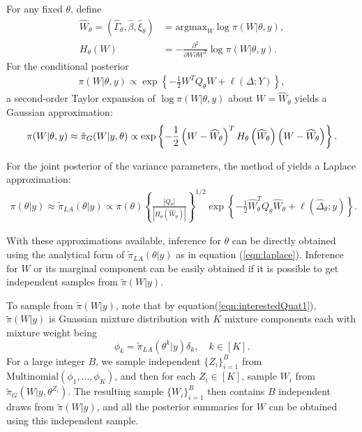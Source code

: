\documentclass[ba]{imsart}
\begin{document}
For any fixed $\theta$, define
\begin{equation}\begin{aligned}\label{eqn:modeandhessian}
\widehat{W}_{\theta} = \left(\widehat{\Gamma}_{\theta},\widehat{\beta},\widehat{\xi}_{\theta}\right) &= \text{argmax}_{W}\log\pi(W|\theta,y) , \\ 
H_{\theta}(W) &= -\frac{\partial^{2}}{\partial W \partial W^{T}}\log\pi(W|\theta,y).
\end{aligned}\end{equation}
For the conditional posterior
\begin{equation}\begin{aligned}\label{eqn:condpost}
\pi(W|\theta,y) \propto \exp\left\lbrace -\frac{1}{2}W^{T}Q_{\theta}W + \ell\left(\Delta;Y\right)\right\rbrace,
\end{aligned}\end{equation}
a second-order Taylor expansion of $\log\pi(W|\theta,y)$ about $W = \widehat{W}_{\theta}$ yields a Gaussian approximation:
\begin{equation}\label{eqn:gaussianapprox}
\pi(W|\theta,y) \approx \tilde{\pi}_{G}(W|y,\theta) \propto \text{exp}\left\{-\frac{1}{2} \left(W-\widehat{W}_{\theta} \right)^T H_\theta\left(\widehat{W}_{\theta}\right) \left(W-\widehat{W}_{\theta} \right) \right\}. \\
\end{equation}

For the joint posterior of the variance parameters, the method of \cite{tierney} yields a Laplace approximation:
\begin{equation}\begin{aligned}\label{eqn:laplace}
\pi(\theta|y) \approx \tilde{\pi}_{LA}(\theta|y) \propto \pi(\theta)\left\{\frac{\left|Q_{\theta}\right|}{\left|H_{\theta}\left(\widehat{W}_{\theta}\right)\right|}\right\}^{1/2}\exp\left\{ -\frac{1}{2}\widehat{W}_{\theta}^{T}Q_{\theta}\widehat{W}_{\theta} + \ell\left(\widehat{\Delta}_{\theta};y \right)\right\}.
\end{aligned}\end{equation}

With these approximations available, inference for $\theta$ can be directly obtained using the analytical form of $\tilde{\pi}_{LA}(\theta|y)$ as in equation (\ref{eqn:laplace}). Inference for $W$ or its marginal component can be easily obtained if it is possible to get independent samples from $\tilde{\pi}(W|y)$. 

To sample from $\tilde{\pi}(W|y)$, note that by equation(\ref{eqn:interestedQuat1}), $\tilde{\pi}(W|y)$ is Guassian mixture distribution with $K$ mixture components each with mixture weight being $$\phi_k = \tilde{\pi}_{LA}(\theta^{k}|y)\delta_{k},\quad k \in [K].$$
For a large integer $B$, we sample independent $\{Z_i\}_{i=1}^{B}$ from $\text{Multinomial}(\phi_1,...,\phi_K)$, and then for each $Z_i \in [K]$, sample $W_i$ from $\tilde{\pi}_{G}(W|y,\theta^{Z_i})$. The resulting sample $\{W_i\}_{i=1}^{B}$ then contains $B$ independent draws from $\tilde{\pi}(W|y)$, and all the posterior summaries for $W$ can be obtained using this independent sample.
\end{document}
